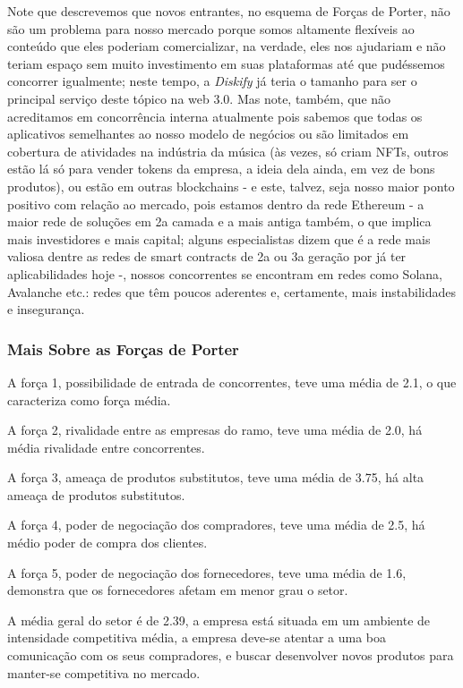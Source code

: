 \documentclass[onecolumn,12pt]{asme2ej}
\begin{document}
Note que descrevemos que novos entrantes, no esquema de Forças de Porter, não são um problema para nosso mercado porque somos altamente flexíveis ao conteúdo que eles poderiam comercializar, na verdade, eles nos ajudariam e não teriam espaço sem muito investimento em suas plataformas até que pudéssemos concorrer igualmente; neste tempo, a {\it Diskify} já teria o tamanho para ser o principal serviço deste tópico na web 3.0. Mas note, também, que não acreditamos em concorrência interna atualmente pois sabemos que todas os aplicativos semelhantes ao nosso modelo de negócios ou são limitados em cobertura de atividades na indústria da música (às vezes, só criam NFTs, outros estão lá só para vender tokens da empresa, a ideia dela ainda, em vez de bons produtos), ou estão em outras blockchains - e este, talvez, seja nosso maior ponto positivo com relação ao mercado, pois estamos dentro da rede Ethereum - a maior rede de soluções em 2a camada e a mais antiga também, o que implica mais investidores e mais capital; alguns especialistas dizem que é a rede mais valiosa dentre as redes de smart contracts de 2a ou 3a geração por já ter aplicabilidades hoje -, nossos concorrentes se encontram em redes como Solana, Avalanche etc.: redes que têm poucos aderentes e, certamente, mais instabilidades e insegurança.
 
\subsubsection{Mais Sobre as Forças de Porter}

A força 1, possibilidade de entrada de concorrentes, teve uma média de 2.1, o que caracteriza como força média.

A força 2, rivalidade entre as empresas do ramo, teve uma média de 2.0, há média rivalidade entre concorrentes.

A força 3, ameaça de produtos substitutos, teve uma média de 3.75, há alta ameaça de produtos substitutos.

A força 4, poder de negociação dos compradores, teve uma média de 2.5, há médio poder de compra dos clientes.

A força 5, poder de negociação dos fornecedores, teve uma média de 1.6, demonstra que os fornecedores afetam em menor grau o setor.

A média geral do setor é de 2.39, a empresa está situada em um ambiente de intensidade competitiva média, a empresa deve-se atentar a uma boa comunicação com os seus compradores, e buscar desenvolver novos produtos para manter-se competitiva no mercado.
\end{document}
